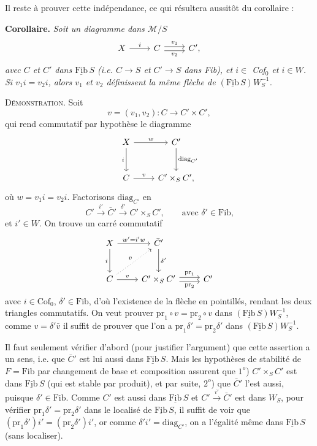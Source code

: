 \documentclass[11pt]{article}
\newcommand{\printedpage}[1]{\marginpar{\footnotesize p.~#1}}
\newcommand{\msp}[1]{\marginpar{\footnotesize [#1]}}
\newcommand{\cM}{\mathcal{M}}
\newcommand{\Fib}{\underline{\mathrm{Fib}}\,}
\begin{document}
Il reste à prouver cette indépendance,
\msp{page 92}ce qui résultera aussitôt du corollaire :

\textbf{Corollaire.} \textit{Soit un diagramme dans $\cM/S$}
\[
\begin{tikzcd}
X \arrow[r, "i"] & C \arrow[r, shift left, "v_1"] \arrow[r, shift right, "v_2"'] & C',
\end{tikzcd}
\]
\textit{avec $C$ et $C'$ dans $\Fib S$ (i.e. $C\longrightarrow S$ et $C'\longrightarrow S$ dans Fib), et $i\in$ Cof$_0$ et $i\in W$. Si
$v_1i=v_2i$, alors $v_1$ et $v_2$ définissent la même flèche de $(\Fib S)W_S^{-1}$.}

\printedpage{58}
\textsc{Démonstration}. Soit
\[
v=(v_1,v_2):C\longrightarrow C'\times C',
\]
 qui rend commutatif par hypothèse le diagramme
\[
\begin{tikzcd}[row sep=large]
X \arrow[r, "w"] \arrow[d, "i"'] & C' \arrow[d, "\mathrm{diag}_{C'}"] \\
C \arrow[r, "v"] & C'\times_S C',
\end{tikzcd}
\]
où $w=v_1i=v_2i$. Factorisons $\mathrm{diag}_{C'}$ en
\[
C'\xrightarrow{\ i'\ }\bar{C}'\xrightarrow{\ \delta'\ }C'\times_S C', \qquad \text{avec $\delta'\in\mathrm{Fib}$,}
\]
et $i'\in W$. On trouve un carré commutatif
\[
\begin{tikzcd}[row sep=large]
X \arrow[r, "w'=i'w"] \arrow[d, "i"'] & \bar{C}' \arrow[d, "\delta'"] & \\
C \arrow[r, "v"] \arrow[ur, dotted, "\bar{v}"] & C'\times_S C' \arrow[r, shift left, "\mathrm{pr}_1"] \arrow[r, shift right, "\mathrm{pr}_2"'] & C'
\end{tikzcd}
\]
avec $i\in\mathrm{Cof}_0$, $\delta'\in\mathrm{Fib}$, d'où l'existence de la flèche en pointillés, rendant les deux triangles
commutatifs. On veut prouver $\mathrm{pr}_1\circ v=\mathrm{pr}_2\circ v$ dans $(\Fib S)W_S^{-1}$, comme $v=\delta'\bar{v}$ il suffit
de prouver que l'on a $\mathrm{pr}_1\delta'=\mathrm{pr}_2\delta'$ dans $(\Fib S)W_S^{-1}$.

\msp{page 93}Il faut seulement vérifier d'abord (pour justifier l'argument) que cette assertion a un sens,
i.e. que $\bar{C}'$ est lui aussi dans $\Fib S$. Mais les hypothèses de stabilité de $F=\mathrm{Fib}$ par
changement de base et composition assurent que $1^o$) $C'\times_S C'$ est dans $\Fib S$ (qui est
stable par produit), et par suite, $2^o$) que $\bar{C}'$ l'est aussi, puisque $\delta'\in\mathrm{Fib}$. Comme $C'$ est
aussi dans $\Fib S$ et $C'\xrightarrow{\ i'\ }\bar{C}'$ est dans $W_S$, pour vérifier $\mathrm{pr}_1\delta'=\mathrm{pr}_2\delta'$ dans le localisé de
$\Fib S$, il suffit de voir que $(\mathrm{pr}_1\delta')i'=(\mathrm{pr}_2\delta')i'$, or comme $\delta'i'=\mathrm{diag}_{C'}$, on a l'égalité même
dans $\Fib S$ (sans localiser).
\end{document}
